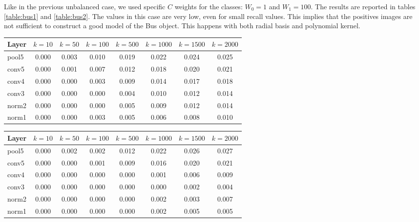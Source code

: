 Like in the previous unbalanced case, we used specific $C$ weights for the
classes: $W_0 = 1$ and $W_1 = 100$. The results are reported in tables
\ref{table:bus1} and \ref{table:bus2}. The values in this case are very low,
even for small recall values. This implies that the positives images are not
sufficient to construct a good model of the Bus object. This happens with both
radial basis and polynomial kernel.

\begin{table*}[t!]
\caption{Average precision on Bus - Radial basis}
\centering
\begin{tabular}{lccccccc}
    Layer       & $k=10$ & $k=50$ & $k=100$ & $k=500$ & $k=1000$ & $k=1500$ &
    $k=2000$ \\
    \midrule
    pool5        & 0.000 & 0.003 & 0.010 & 0.019 & 0.022 & 0.024 & 0.025 \\
    conv5        & 0.000 & 0.001 & 0.007 & 0.012 & 0.018 & 0.020 & 0.021 \\
    conv4        & 0.000 & 0.000 & 0.003 & 0.009 & 0.014 & 0.017 & 0.018 \\
    conv3        & 0.000 & 0.000 & 0.000 & 0.004 & 0.010 & 0.012 & 0.014 \\
    norm2        & 0.000 & 0.000 & 0.000 & 0.005 & 0.009 & 0.012 & 0.014 \\
    norm1        & 0.000 & 0.000 & 0.003 & 0.005 & 0.006 & 0.008 & 0.010 \\
\end{tabular}
\label{table:bus1}
\end{table*}

\begin{table*}[t!]
\caption{Average precision on Bus - Polynomial degree 3}
\centering
\begin{tabular}{lccccccc}
    Layer       & $k=10$ & $k=50$ & $k=100$ & $k=500$ & $k=1000$ & $k=1500$ &
    $k=2000$ \\
    \midrule
    pool5        & 0.000 & 0.002 & 0.002 & 0.012 & 0.022 & 0.026 & 0.027 \\
    conv5        & 0.000 & 0.000 & 0.001 & 0.009 & 0.016 & 0.020 & 0.021 \\
    conv4        & 0.000 & 0.000 & 0.000 & 0.000 & 0.001 & 0.006 & 0.009 \\
    conv3        & 0.000 & 0.000 & 0.000 & 0.000 & 0.000 & 0.002 & 0.004 \\
    norm2        & 0.000 & 0.000 & 0.000 & 0.000 & 0.002 & 0.003 & 0.007 \\
    norm1        & 0.000 & 0.000 & 0.000 & 0.000 & 0.002 & 0.005 & 0.005 \\
\end{tabular}
\label{table:bus2}
\end{table*}

